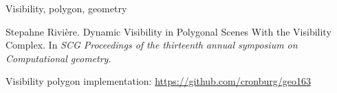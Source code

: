 \documentclass[10pt,preprint]{sigplanconf}
\begin{document}


\keywords
Visibility, polygon, geometry













\begin{thebibliography}{}
\softraggedright



Stepahne Rivière.
Dynamic Visibility in Polygonal Scenes With the Visibility Complex.
In \emph{SCG Proceedings of the thirteenth annual symposium on Computational geometry}.

Visibility polygon implementation:
\href{https://github.com/cronburg/geo163}{https://github.com/cronburg/geo163}

\end{thebibliography}
\end{document}
